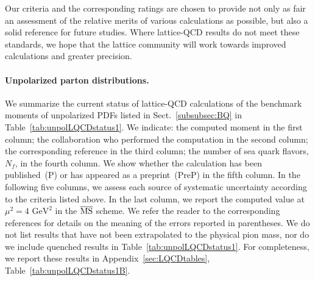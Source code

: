 Our criteria and the corresponding ratings are chosen to provide not only as 
fair an assessment of the relative merits of various calculations as possible, 
but also a solid reference for future studies.
%
Where lattice-QCD results do not meet these standards, we hope that the lattice 
community will work towards improved calculations and greater precision.

\paragraph{Unpolarized parton distributions.}
We summarize the current status of lattice-QCD calculations of the benchmark 
moments of unpolarized PDFs listed in Sect.~\ref{subsubsec:BQ} in 
Table~\ref{tab:unpolLQCDstatus1}. 
%
We indicate: the computed moment in the first column; the collaboration who
performed the computation in the second column; the corresponding reference
in the third column; the number of sea quark flavors, $N_f$, in the fourth 
column.
%
We show whether the calculation has been published~(P) 
or has appeared as a preprint~(PreP) in the fifth column.
%
In the following five columns, we assess each source of systematic uncertainty
according to the criteria listed above. 
%
In the last column, we report the computed value at $\mu^2=4\mbox{ GeV}^2$
in the $\overline{{\rm MS}}$ scheme.
%
We refer the reader to the corresponding references for details on the 
meaning of the errors reported in parentheses.
%
We do not list results that have not been extrapolated to the physical pion 
mass, nor do we include quenched results in Table~\ref{tab:unpolLQCDstatus1}. 
%
For completeness, we report these results in  Appendix~\ref{sec:LQCDtables},
Table~\ref{tab:unpolLQCDstatus1B}.

